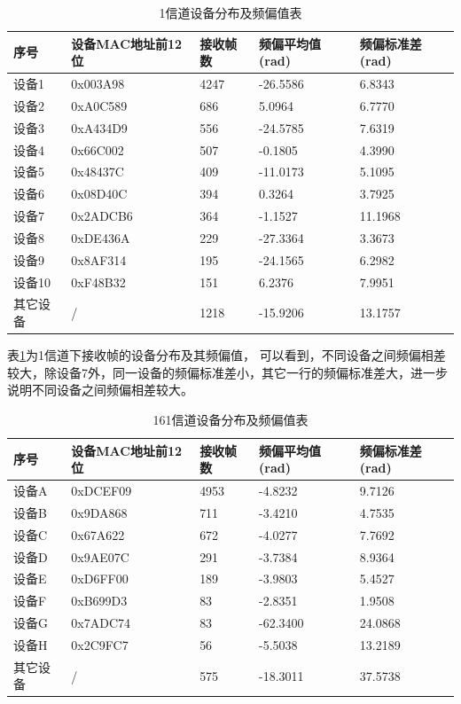       \begin{table}[!hbp]
      \centering
      \caption{1信道设备分布及频偏值表}
      \label{tab:envaluate_2412_frame_number}
        \begin{tabular}{|l|l|l|l|l|} \hline
        序号 & 设备MAC地址前12位 & 接收帧数 & 频偏平均值(rad) & 频偏标准差(rad) \\ \hline
        设备1  & 0x003A98 & 4247 & -26.5586 & 6.8343 \\ \hline
        设备2  & 0xA0C589 & 686  & 5.0964 & 6.7770 \\ \hline
        设备3  & 0xA434D9 & 556  & -24.5785 & 7.6319 \\ \hline
        设备4  & 0x66C002 & 507  & -0.1805 & 4.3990 \\ \hline
        设备5  & 0x48437C & 409  & -11.0173 & 5.1095 \\ \hline
        设备6  & 0x08D40C & 394  & 0.3264 & 3.7925 \\ \hline
        设备7  & 0x2ADCB6 & 364  & -1.1527 & 11.1968 \\ \hline
        设备8  & 0xDE436A & 229  & -27.3364 & 3.3673 \\ \hline
        设备9  & 0x8AF314 & 195  & -24.1565 & 6.2982 \\ \hline
        设备10 & 0xF48B32 & 151  & 6.2376 & 7.9951 \\ \hline
        其它设备 & /      & 1218 & -15.9206 & 13.1757 \\ \hline
        \end{tabular}
      \end{table}

    表\ref{tab:envaluate_2412_frame_number}为1信道下接收帧的设备分布及其频偏值，
    可以看到，不同设备之间频偏相差较大，除设备7外，同一设备的频偏标准差小，其它一行的频偏标准差大，进一步说明不同设备之间频偏相差较大。

      \begin{table}[!hbp]
      \centering
      \caption{161信道设备分布及频偏值表}
      \label{tab:envaluate_5805_frame_number}
        \begin{tabular}{|l|l|l|l|l|} \hline
        序号 & 设备MAC地址前12位 & 接收帧数 & 频偏平均值(rad) & 频偏标准差(rad) \\ \hline
        设备A  & 0xDCEF09 & 4953 & -4.8232 & 9.7126 \\ \hline
        设备B  & 0x9DA868 &  711 & -3.4210 & 4.7535 \\ \hline
        设备C  & 0x67A622 &  672 & -4.0277 & 7.7692 \\ \hline
        设备D  & 0x9AE07C &  291 & -3.7384 & 8.9364 \\ \hline
        设备E  & 0xD6FF00 &  189 & -3.9803 & 5.4527 \\ \hline
        设备F  & 0xB699D3 &   83 & -2.8351 & 1.9508 \\ \hline
        设备G  & 0x7ADC74 &   83 & -62.3400 & 24.0868 \\ \hline
        设备H  & 0x2C9FC7 &   56 & -5.5038 & 13.2189 \\ \hline
        其它设备 & /      &  575 & -18.3011 & 37.5738 \\ \hline
        \end{tabular}
      \end{table}

